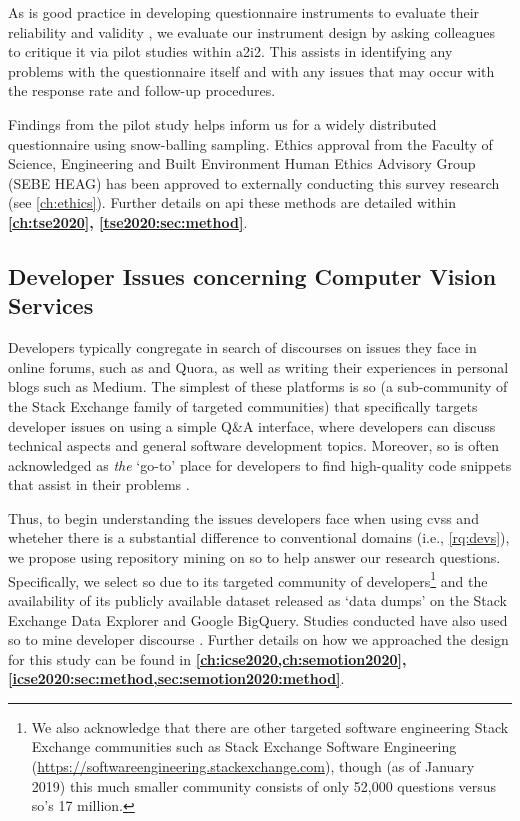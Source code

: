 As is good practice in developing questionnaire instruments to evaluate their reliability and validity \citep{Litwin:1995wt}, we evaluate our instrument design by asking colleagues to critique it via pilot studies within \gls{a2i2}. This assists in identifying any problems with the questionnaire itself and with any issues that may occur with the response rate and follow-up procedures.

Findings from the pilot study helps inform us for a widely distributed questionnaire using snow-balling sampling. Ethics approval from the Faculty of Science, Engineering and Built Environment Human Ethics Advisory Group (SEBE HEAG) has been approved to externally conducting this survey research (see \cref{ch:ethics}). 
Further details on \gls{api} these methods are detailed within \textbf{\cref{ch:tse2020}, \cref{tse2020:sec:method}}.

\subsection{Developer Issues concerning Computer Vision Services}

Developers typically congregate in search of discourses on issues they face in online forums, such as  and Quora, as well as writing their experiences in personal blogs such as Medium. The simplest of these platforms is \gls{so} (a sub-community of the Stack Exchange family of targeted communities) that specifically targets developer issues on using a simple Q\&A interface, where developers can discuss technical aspects and general software development topics. Moreover, \gls{so} is often acknowledged as \textit{the} `go-to' place for developers to find high-quality code snippets that assist in their problems \citep{Subramanian:2014bg}.

Thus, to begin understanding the issues developers face when using \glspl{cvs} and wheteher there is a substantial difference to conventional domains (i.e., \ref{rq:devs}), we propose using repository mining on \gls{so} to help answer our research questions. Specifically, we select \gls{so} due to its targeted community of developers\footnote{We also acknowledge that there are other targeted software engineering Stack Exchange communities such as Stack Exchange Software Engineering (\url{https://softwareengineering.stackexchange.com}), though (as of January 2019) this much smaller community consists of only 52,000 questions versus \gls{so}'s 17 million.} and the availability of its publicly available dataset released as `data dumps' on the Stack Exchange Data Explorer and Google BigQuery. Studies conducted have also used \gls{so} to mine developer discourse \citep{Choi:2015wo,Sinha:2013tt,Novielli:2015vda,Rosen:2016uk,Pal:2012te,Bajaj:2014wg,LinaresVasquez:2014vj,Wang:2013ue,Barua:2012gz,Reboucas:2016tw,Allamanis:2013is,Tahir:2018ks}.
Further details on how we approached the design for this study can be found in \textbf{\cref{ch:icse2020,ch:semotion2020}, \cref{icse2020:sec:method,sec:semotion2020:method}}.

